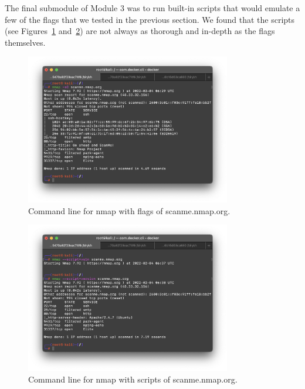 \documentclass[12pt]{article}
\begin{document}
The final submodule of Module 3 was to run built-in scripts that would emulate a few of the flags that we tested in the previous section. We found that the scripts (see Figures~\ref{fig:nmap05} and~\ref{fig:nmap06}) are not always as thorough and in-depth as the flags themselves.

\begin{figure}[!ht]
    \centering
    \includegraphics[width=0.8\textwidth]{figure09.png}\vspace{-1em}
    \caption{Command line for nmap with flags of scanme.nmap.org.}
    \label{fig:nmap05}
\end{figure}

\begin{figure}[!ht]
    \centering
    \includegraphics[width=0.8\textwidth]{figure10.png}\vspace{-1em}
    \caption{Command line for nmap with scripts of scanme.nmap.org.}
    \label{fig:nmap06}
\end{figure}
\end{document}
